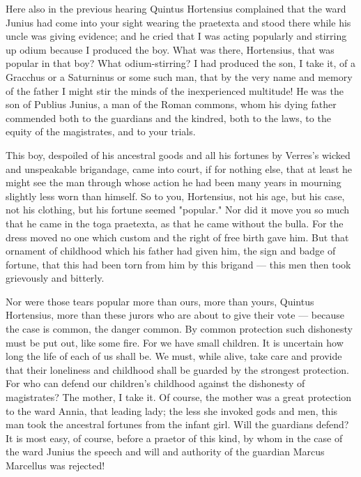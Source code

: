  Here also in the previous hearing Quintus Hortensius complained that the ward Junius had come into your sight wearing the praetexta and stood there while his uncle was giving evidence; and he cried that I was acting popularly and stirring up odium because I produced the boy. What was there, Hortensius, that was popular in that boy? What odium-stirring? I had produced the son, I take it, of a Gracchus or a Saturninus or some such man, that by the very name and memory of the father I might stir the minds of the inexperienced multitude! He was the son of Publius Junius, a man of the Roman commons, whom his dying father commended both to the guardians and the kindred, both to the laws, to the equity of the magistrates, and to your trials.

 This boy, despoiled of his ancestral goods and all his fortunes by Verres's wicked and unspeakable brigandage, came into court, if for nothing else, that at least he might see the man through whose action he had been many years in mourning slightly less worn than himself. So to you, Hortensius, not his age, but his case, not his clothing, but his fortune seemed "popular." Nor did it move you so much that he came in the toga praetexta, as that he came without the bulla. For the dress moved no one which custom and the right of free birth gave him. But that ornament of childhood which his father had given him, the sign and badge of fortune, that this had been torn from him by this brigand --- this men then took grievously and bitterly.

 Nor were those tears popular more than ours, more than yours, Quintus Hortensius, more than these jurors who are about to give their vote --- because the case is common, the danger common. By common protection such dishonesty must be put out, like some fire. For we have small children. It is uncertain how long the life of each of us shall be. We must, while alive, take care and provide that their loneliness and childhood shall be guarded by the strongest protection. For who can defend our children's childhood against the dishonesty of magistrates? The mother, I take it. Of course, the mother was a great protection to the ward Annia, that leading lady; the less she invoked gods and men, this man took the ancestral fortunes from the infant girl. Will the guardians defend? It is most easy, of course, before a praetor of this kind, by whom in the case of the ward Junius the speech and will and authority of the guardian Marcus Marcellus was rejected!

